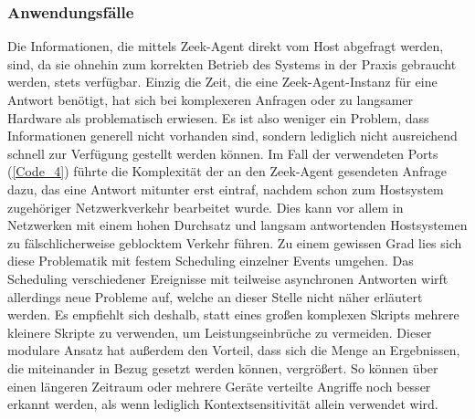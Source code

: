 \subsubsection{Anwendungsfälle}
Die Informationen, die mittels Zeek-Agent direkt vom Host abgefragt werden, sind, da sie ohnehin zum korrekten Betrieb des Systems in der Praxis gebraucht werden, stets verfügbar. Einzig die Zeit, die eine Zeek-Agent-Instanz für eine Antwort benötigt, hat sich bei komplexeren Anfragen oder zu langsamer Hardware als problematisch erwiesen. Es ist also weniger ein Problem, dass Informationen generell nicht vorhanden sind, sondern lediglich nicht ausreichend schnell zur Verfügung gestellt werden können. Im Fall der verwendeten Ports (\ref{Code_4}) führte die Komplexität der an den Zeek-Agent gesendeten Anfrage dazu, das eine Antwort mitunter erst eintraf, nachdem schon zum Hostsystem zugehöriger Netzwerkverkehr bearbeitet wurde. Dies kann vor allem in Netzwerken mit einem hohen Durchsatz und langsam antwortenden Hostsystemen zu fälschlicherweise geblocktem Verkehr führen. Zu einem gewissen Grad lies sich diese Problematik mit festem Scheduling einzelner Events umgehen. Das Scheduling verschiedener Ereignisse mit teilweise asynchronen Antworten wirft allerdings neue Probleme auf, welche an dieser Stelle nicht näher erläutert werden. Es empfiehlt sich deshalb, statt eines großen komplexen Skripts mehrere kleinere Skripte zu verwenden, um Leistungseinbrüche zu vermeiden. Dieser modulare Ansatz hat außerdem den Vorteil, dass sich die Menge an Ergebnissen, die miteinander in Bezug gesetzt werden können, vergrößert. So können über einen längeren Zeitraum oder mehrere Geräte verteilte Angriffe noch besser erkannt werden, als wenn lediglich Kontextsensitivität allein verwendet wird.
